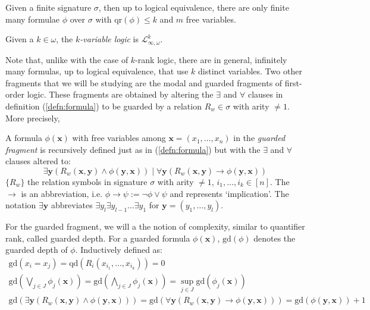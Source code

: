 \begin{prop}
Given a finite signature $\sigma$, then up to logical equivalence, there are only finite many formulae $\phi$ over $\sigma$ with $\text{qr}(\phi)\leq k$ and $m$ free variables.
\end{prop}
\begin{defn}
Given a $k \in \omega$, the \textit{$k$-variable logic} is $\mathcal{L}^{k}_{\infty,\omega}$.
\end{defn}
Note that, unlike with the case of $k$-rank logic, there are in general, infinitely many formulas, up to logical equivalence, that use $k$ distinct variables. Two other fragments that we will be studying are the modal and guarded fragments of first-order logic. These fragments are obtained by altering the $\exists$ and $\forall$ clauses in definition (\ref{defn:formula}) to be guarded by a relation $R_{w} \in \sigma$ with arity $\not= 1$. More precisely,  
\begin{defn}
A formula $\phi(\mathbf{x})$ with free variables among $\mathbf{x} = (x_{1},\dots,x_{n})$ in the \textit{guarded fragment} is recursively defined just as in (\ref{defn:formula}) but with the $\exists$ and $\forall$ clauses altered to:  
$$ \exists \mathbf{y} (R_{w}(\mathbf{x},\mathbf{y}) \wedge \phi(\mathbf{y},\mathbf{x})) \mid \forall \mathbf{y}(R_{w}(\mathbf{x},\mathbf{y}) \rightarrow \phi(\mathbf{y},\mathbf{x}))$$
$\{R_{w}\}$ the relation symbols in signature $\sigma$ with arity $\not= 1$, $i_{1},\dots,i_{k} \in [n]$. The $\rightarrow$ is an abbreviation, i.e. $\phi \rightarrow \psi := \neg \phi \vee \psi$ and represents `implication'. The notation $\exists \mathbf{y}$ abbreviates $\exists y_{l} \exists y_{l-1} \dots \exists y_{1}$ for $\mathbf{y} = (y_{1},\dots,y_{l})$.
\end{defn}
For the guarded fragment, we will a the notion of complexity, similar to quantifier rank, called guarded depth. For a guarded formula $\phi(\mathbf{x})$, $\text{gd}(\phi)$ denotes the guarded depth of $\phi$. Inductively defined as:   
\begin{eqnarray*}
\text{gd}(x_{i} = x_{j}) = \text{qd}(R_{i}(x_{i_{1}},\dots,x_{i_{k}})) = 0 \\
\text{gd}(\bigvee_{j \in J} \phi_{j}(\mathbf{x})) = \text{gd}(\bigwedge_{j \in J} \phi_{j}(\mathbf{x}))  = \sup_{j \in J} \text{gd}(\phi_{j}(\mathbf{x})) \\
\text{gd}(\exists \mathbf{y} (R_{w}(\mathbf{x},\mathbf{y}) \wedge \phi(\mathbf{y},\mathbf{x}))) = \text{gd}(\forall \mathbf{y}(R_{w}(\mathbf{x},\mathbf{y}) \rightarrow \phi(\mathbf{y},\mathbf{x}))) = \text{gd}(\phi(\mathbf{y},\mathbf{x})) + 1 
\end{eqnarray*}
